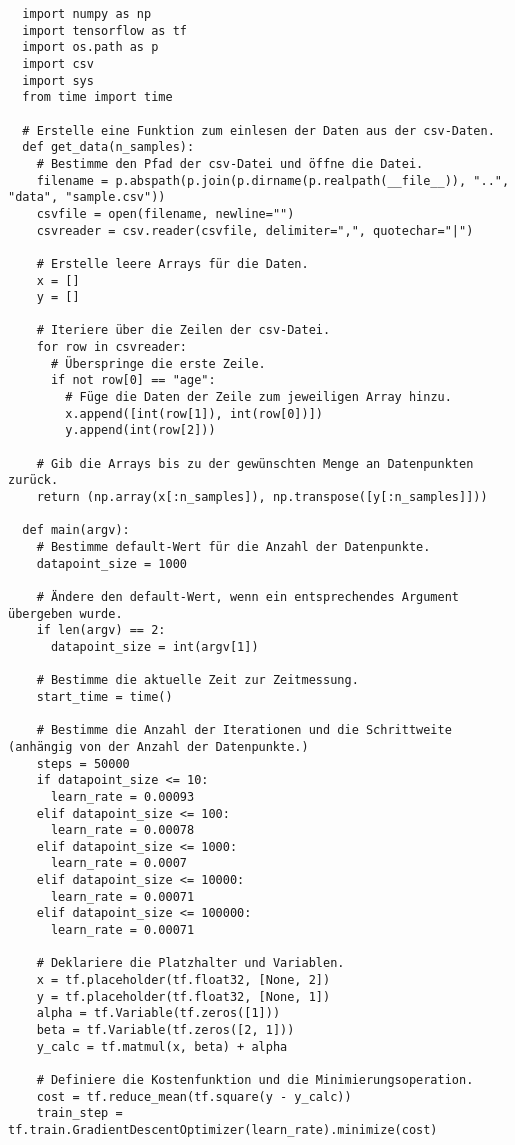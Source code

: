 \begin{verbatim}
  import numpy as np
  import tensorflow as tf
  import os.path as p
  import csv
  import sys
  from time import time

  # Erstelle eine Funktion zum einlesen der Daten aus der csv-Daten.
  def get_data(n_samples):
    # Bestimme den Pfad der csv-Datei und öffne die Datei.
    filename = p.abspath(p.join(p.dirname(p.realpath(__file__)), "..", "data", "sample.csv"))
    csvfile = open(filename, newline="")
    csvreader = csv.reader(csvfile, delimiter=",", quotechar="|")

    # Erstelle leere Arrays für die Daten.
    x = []
    y = []

    # Iteriere über die Zeilen der csv-Datei.
    for row in csvreader:
      # Überspringe die erste Zeile.
      if not row[0] == "age":
        # Füge die Daten der Zeile zum jeweiligen Array hinzu.
        x.append([int(row[1]), int(row[0])])
        y.append(int(row[2]))

    # Gib die Arrays bis zu der gewünschten Menge an Datenpunkten zurück.
    return (np.array(x[:n_samples]), np.transpose([y[:n_samples]]))

  def main(argv):
    # Bestimme default-Wert für die Anzahl der Datenpunkte.
    datapoint_size = 1000

    # Ändere den default-Wert, wenn ein entsprechendes Argument übergeben wurde.
    if len(argv) == 2:
      datapoint_size = int(argv[1])

    # Bestimme die aktuelle Zeit zur Zeitmessung.
    start_time = time()

    # Bestimme die Anzahl der Iterationen und die Schrittweite (anhängig von der Anzahl der Datenpunkte.)
    steps = 50000
    if datapoint_size <= 10:
      learn_rate = 0.00093
    elif datapoint_size <= 100:
      learn_rate = 0.00078
    elif datapoint_size <= 1000:
      learn_rate = 0.0007
    elif datapoint_size <= 10000:
      learn_rate = 0.00071
    elif datapoint_size <= 100000:
      learn_rate = 0.00071

    # Deklariere die Platzhalter und Variablen.
    x = tf.placeholder(tf.float32, [None, 2])
    y = tf.placeholder(tf.float32, [None, 1])
    alpha = tf.Variable(tf.zeros([1]))
    beta = tf.Variable(tf.zeros([2, 1]))
    y_calc = tf.matmul(x, beta) + alpha

    # Definiere die Kostenfunktion und die Minimierungsoperation.
    cost = tf.reduce_mean(tf.square(y - y_calc))
    train_step = tf.train.GradientDescentOptimizer(learn_rate).minimize(cost)


\end{verbatim}
